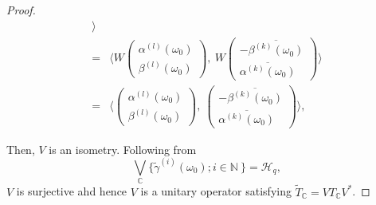 \documentclass[10pt,a4paper]{amsart}
\begin{document}
\begin{proof}
\begin{equation*}
\begin{aligned}
		\rangle \\
		= & \langle
		W\begin{pmatrix}
			\alpha^{(l)}(\omega_0) \\
			\beta^{(l)}(\omega_0)
		\end{pmatrix},\
		W\begin{pmatrix}
			-\overline{\beta^{(k)}(\omega_0)} \\
			\overline{\alpha^{(k)}(\omega_0)}
		\end{pmatrix}
		\rangle \\
		= & \langle
		\begin{pmatrix}
			\alpha^{(l)}(\omega_0) \\
			\beta^{(l)}(\omega_0)
		\end{pmatrix},\
		\begin{pmatrix}
			-\overline{\beta^{(k)}(\omega_0)} \\
			\overline{\alpha^{(k)}(\omega_0)}
		\end{pmatrix}
		\rangle,
	\end{aligned}
\end{equation*}

   Then, $V$ is an isometry. Following from
   \[
   {\bigvee}_{\mathbb{C}}\{\widetilde{\gamma}^{(i)}(\omega_0); i\in\mathbb{N}\ \}=\mathcal{H}_q,
   \]
   $V$ is surjective ahd hence $V$ is a unitary operator satisfying $\widetilde{T}_{\mathbb{C}}=VT_{\mathbb{C}}V^*$.


\end{proof}
\end{document}
